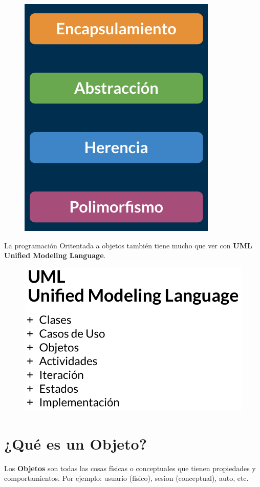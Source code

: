 \documentclass{article}
\begin{document}
\begin{figure}[h!]
  \centering
  \includegraphics[scale=0.45]{./Pictures/002_pilares_POO.png}
\end{figure}

La programación Oritentada a objetos también tiene mucho que ver con
\textbf{UML Unified Modeling Language}.\\

\begin{figure}[h!]
  \centering
  \includegraphics[scale=0.4]{./Pictures/003_uml.png}
\end{figure}

\section{¿Qué es un Objeto?}%
Los \textbf{Objetos} son todas las cosas físicas o conceptuales que tienen
propiedades y comportamientos. Por ejemplo: usuario (fisico), sesion
(conceptual), auto, etc.\\
\end{document}
